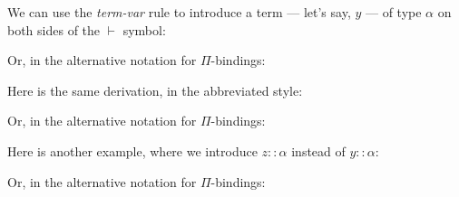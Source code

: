 \documentclass{book}
\numberwithin{equation}{chapter}
\begin{document}
\noindent
We can use the \textit{term-var} rule to introduce a term --- let's say, $y$ --- of type $\alpha$ on both sides of the $\vdash$ symbol:

\begin{prooftree}
\end{prooftree}

\noindent
Or, in the alternative notation for $\Pi$-bindings:

\begin{prooftree}
\end{prooftree}

\noindent
Here is the same derivation, in the abbreviated style:

\begin{prooftree}
\end{prooftree}

\noindent
Or, in the alternative notation for $\Pi$-bindings:

\begin{prooftree}
\end{prooftree}

\noindent
Here is another example, where we introduce $z :: \alpha$ instead of $y :: \alpha$:

\begin{prooftree}
\end{prooftree}

\noindent
Or, in the alternative notation for $\Pi$-bindings:

\begin{prooftree}
\end{prooftree}


\end{document}
